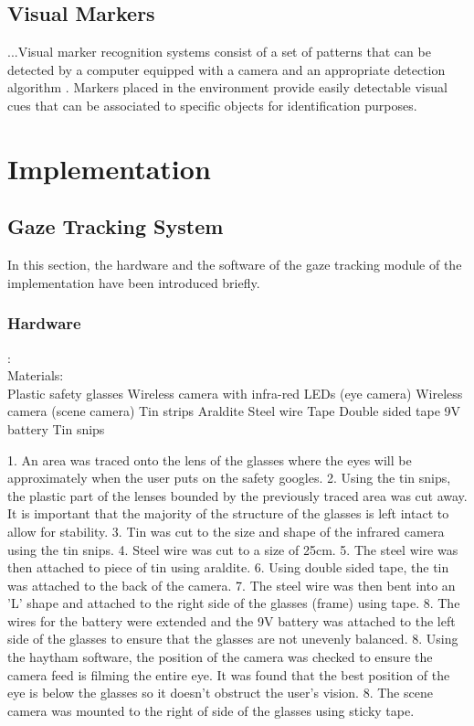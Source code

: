\documentclass[jou,a4paper,notxfonts]{apa}
\begin{document}
\subsection{Visual Markers}

...Visual marker recognition systems consist of a set of patterns that can be detected by a computer equipped with a camera and an appropriate detection algorithm \cite{middel19detection}. Markers placed in the environment provide easily detectable visual cues that can be associated to specific objects for identification purposes.




\section{Implementation}
\subsection{Gaze Tracking System}
In this section, the hardware and the software of the gaze tracking module of the implementation have been introduced briefly. 
\subsubsection{Hardware}
:
\\Materials:
\\Plastic safety glasses
Wireless camera with infra-red LEDs (eye camera)
Wireless camera	(scene camera)
Tin strips
Araldite
Steel wire
Tape
Double sided tape
9V battery
Tin snips

1. An area was traced onto the lens of the glasses where the eyes will be approximately when the user puts on the safety googles. 
2. Using the tin snips, the plastic part of the lenses bounded by the previously traced area was cut away. It is important that the
majority of the structure of the glasses is left intact to allow for stability.
3. Tin was cut to the size and shape of the infrared camera using the tin snips.
4. Steel wire was cut to a size of 25cm.
5. The steel wire was then attached to piece of tin using araldite.
6. Using double sided tape, the tin was attached to the back of the camera.
7. The steel wire was then bent into an 'L' shape and attached to the right side of the glasses (frame) using tape.
8. The wires for the battery were extended and the 9V battery was attached to the left side of the glasses to ensure that the glasses
are not unevenly balanced.
8. Using the haytham software, the position of the camera was checked to ensure the camera feed is filming the entire eye.
It was found that the best position of the eye is below the glasses so it doesn't obstruct the user's vision. 
8. The scene camera was mounted to the right of side of the glasses using sticky tape.
\end{document}
